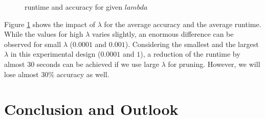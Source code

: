 \documentclass{tudscrartcl}
\theoremstyle{definition}
\begin{document}
\begin{figure}[H]
    \centering
    \qquad
    \caption{runtime and accuracy for given $lambda$}
    \label{fig:ar}
\end{figure}
Figure \ref{fig:ar} shows the impact of $\lambda$ for the average accuracy and the average runtime. While the values for high $\lambda$ varies slightly, an enormous difference can be observed for small $\lambda$ ($0.0001$ and $0.001$). Considering the smallest and the largest $\lambda$ in this experimental design ($0.0001$ and $1$), a reduction of the runtime by almost $30$ seconds can be achieved if we use large $\lambda$ for pruning. However, we will lose almost $30\%$ accuracy as well.


\section{Conclusion and Outlook}
\end{document}
